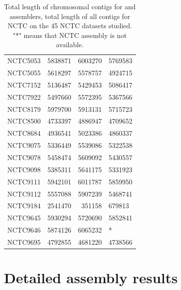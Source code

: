 \documentclass[../../main.tex]{subfiles}
\begin{document}
\begin{table}[!htbp]
\begin{tabular}{l|rrl}
NCTC5053 & 5838871 & 6003270 & 5769583 \\
NCTC5055 & 5618297 & 5578757 & 4924715 \\
NCTC7152 & 5136487 & 5429453 & 5086417 \\
NCTC7922 & 5497660 & 5572395 & 5367566 \\
NCTC8179 & 5979700 & 5913131 & 5715723 \\
NCTC8500 & 4733397 & 4886947 & 4709652 \\
NCTC8684 & 4936541 & 5023386 & 4860337 \\
NCTC9075 & 5336449 & 5539086 & 5322538 \\
NCTC9078 & 5458474 & 5609092 & 5430557 \\
NCTC9098 & 5385311 & 5641175 & 5331923 \\
NCTC9111 & 5942101 & 6011787 & 5859950 \\
NCTC9112 & 5557088 & 5907239 & 5468741 \\
NCTC9184 & 2541470 & 351158 & 679813 \\
NCTC9645 & 5930294 & 5720690 & 5852841 \\
NCTC9646 & 5874126 & 6065232 & * \\
NCTC9695 & 4792855 & 4681220 & 4738566 \\
\hline
\end{tabular}
\caption{Total length of chromosomal contigs for \canu and \miniasm assemblers, total length of all contigs for NCTC on the 45 NCTC datasets studied. "*" means that NCTC assembly is not available.}
\label{tb:appendix:genomic_lengths}
\end{table}
\newpage

\section{Detailed assembly results}
\end{document}
